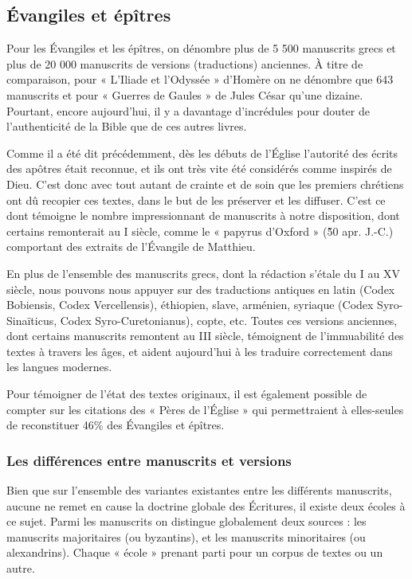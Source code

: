 \begin{small}
\subsection*{Évangiles et épîtres}

Pour les Évangiles et les épîtres, on dénombre plus de 5 500 manuscrits grecs et plus de 20 000 manuscrits de versions (traductions) anciennes. À titre de comparaison, pour « L'Iliade et l'Odyssée » d'Homère on ne dénombre que 643 manuscrits et pour « Guerres de Gaules » de Jules César qu'une dizaine. Pourtant, encore aujourd'hui, il y a davantage d'incrédules pour douter de l'authenticité de la Bible que de ces autres livres.\bigskip

Comme il a été dit précédemment, dès les débuts de l'Église l'autorité des écrits des apôtres était reconnue, et ils ont très vite été considérés comme inspirés de Dieu. C'est donc avec tout autant de crainte et de soin que les premiers chrétiens ont dû recopier ces textes, dans le but de les préserver et les diffuser. C'est ce dont témoigne le nombre impressionnant de manuscrits à notre disposition, dont certains remonterait au I siècle, comme le « papyrus d'Oxford » (\~50 apr. J.-C.) comportant des extraits de l'Évangile de Matthieu.\bigskip

En plus de l'ensemble des manuscrits grecs, dont la rédaction s'étale du I au XV siècle, nous pouvons nous appuyer sur des traductions antiques en latin (Codex Bobiensis, Codex Vercellensis), éthiopien, slave, arménien, syriaque (Codex Syro-Sinaïticus, Codex Syro-Curetonianus), copte, etc. Toutes ces versions anciennes, dont certains manuscrits remontent au III siècle, témoignent de l'immuabilité des textes à travers les âges, et aident aujourd'hui à les traduire correctement dans les langues modernes.\bigskip

Pour témoigner de l'état des textes originaux, il est également possible de compter sur les citations des « Pères de l'Église » qui permettraient à elles-seules de reconstituer 46\% des Évangiles et épîtres.

\subsubsection*{Les différences entre manuscrits et versions}

Bien que sur l'ensemble des variantes existantes entre les différents manuscrits, aucune ne remet en cause la doctrine globale des Écritures, il existe deux écoles à ce sujet. Parmi les manuscrits on distingue globalement deux sources : les manuscrits majoritaires (ou byzantins), et les manuscrits minoritaires (ou alexandrins). Chaque « école » prenant parti pour un corpus de textes ou un autre.\bigskip


\end{small}
